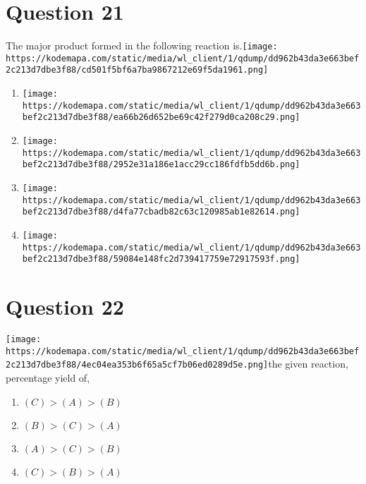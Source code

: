 \documentclass{article}
\begin{document}
\section*{Question 21}
The major product formed in the following reaction is.\texttt{[image: https://kodemapa.com/static/media/wl\_client/1/qdump/dd962b43da3e663bef2c213d7dbe3f88/cd501f5bf6a7ba9867212e69f5da1961.png]}\newline
\begin{enumerate}[label=(\alph*)]
\item \texttt{[image: https://kodemapa.com/static/media/wl\_client/1/qdump/dd962b43da3e663bef2c213d7dbe3f88/ea66b26d652be69c42f279d0ca208c29.png]}
\item \texttt{[image: https://kodemapa.com/static/media/wl\_client/1/qdump/dd962b43da3e663bef2c213d7dbe3f88/2952e31a186e1acc29cc186fdfb5dd6b.png]}
\item \texttt{[image: https://kodemapa.com/static/media/wl\_client/1/qdump/dd962b43da3e663bef2c213d7dbe3f88/d4fa77cbadb82c63c120985ab1e82614.png]}
\item \texttt{[image: https://kodemapa.com/static/media/wl\_client/1/qdump/dd962b43da3e663bef2c213d7dbe3f88/59084e148fc2d739417759e72917593f.png]}
\end{enumerate}
\newpage
\section*{Question 22}
\texttt{[image: https://kodemapa.com/static/media/wl\_client/1/qdump/dd962b43da3e663bef2c213d7dbe3f88/4ec04ea353b6f65a5cf7b06ed0289d5e.png]}\newlineConsider the given reaction, percentage yield of, 
\begin{enumerate}[label=(\alph*)]
\item \((C)>(A)>(B)\)
\item \((B)>(C)>(A)\)
\item \((A)>(C)>(B)\)
\item \((C)>(B)>(A)\)
\end{enumerate}
\newpage
\end{document}
